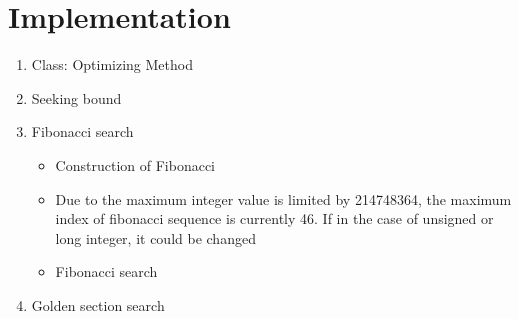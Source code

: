 \documentclass[12pt,letterpaper]{article}
\begin{document}
\newpage
\section*{Implementation}

\begin{enumerate}

\item Class: Optimizing Method


\item Seeking bound

\item Fibonacci search
\begin{itemize}
  \item Construction of Fibonacci
  \item Due to the maximum integer value is limited by 214748364, the maximum index of fibonacci sequence is currently 46. If in the case of unsigned or long integer, it could be changed
\end{itemize}
\begin{itemize}
  \item Fibonacci search
\end{itemize}

\newpage

\item Golden section search

\end{enumerate}
\end{document}
